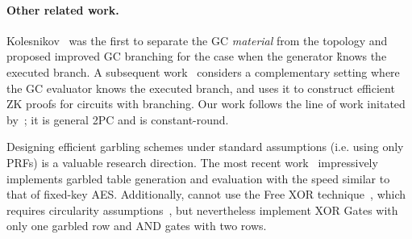 \paragraph{Other related work.}


Kolesnikov~\cite{AC:Kolesnikov18} was the first to separate the GC
{\em material} from the topology and proposed improved GC branching
for the case when the generator \G knows the executed branch.  A
subsequent work~\cite{EC:HeaKol20} considers a complementary setting
where the GC evaluator \E knows the executed branch, and uses it to
construct efficient ZK proofs for circuits with branching.  Our work
follows the line of work initated
by~\cite{AC:Kolesnikov18,EC:HeaKol20}; it is general 2PC and is
constant-round.

Designing efficient garbling schemes under standard assumptions (i.e.
using only PRFs) is a valuable research direction.  The most
recent work~\cite{CCS:GLNP15} impressively implements garbled table
generation and evaluation with the speed similar to that of
fixed-key AES.
Additionally, \cite{CCS:GLNP15} cannot use the Free XOR technique~\cite{ICALP:KolSch08}, which requires circularity
assumptions~\cite{TCC:CKKZ12}, but nevertheless implement XOR Gates
with only one garbled row and AND gates with two rows.



